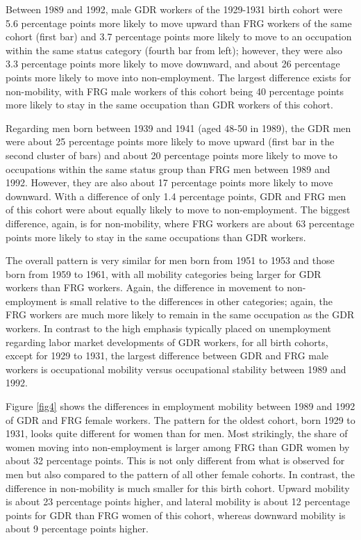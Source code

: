 \begin{Article}
\begin{refsection}[Spitz]
\pagebreak

Between 1989 and 1992, male GDR workers of the 1929-1931 birth cohort were 5.6 percentage points more likely to move upward than FRG workers of the same cohort (first bar) and 3.7 percentage points more likely to move to an occupation within the same status category (fourth bar from left); however, they were also 3.3 percentage points more likely to move downward, and about 26 percentage points more likely to move into non-employment. The largest difference exists for non-mobility, with FRG male workers of this cohort being 40 percentage points more likely to stay in the same occupation than GDR workers of this cohort.

Regarding men born between 1939 and 1941 (aged 48-50 in 1989), the GDR men were about 25 percentage points more likely to move upward (first bar in the second cluster of bars) and about 20 percentage points more likely to move to occupations within the same status group than FRG men between 1989 and 1992. However, they are also about 17 percentage points more likely to move downward. With a difference of only 1.4 percentage points, GDR and FRG men of this cohort were about equally likely to move to non-employment. The biggest difference, again, is for non-mobility, where FRG workers are about 63 percentage points more likely to stay in the same occupations than GDR workers.

The overall pattern is very similar for men born from 1951 to 1953 and those born from 1959 to 1961, with all mobility categories being larger for GDR workers than FRG workers. Again, the difference in movement to non-employment is small relative to the differences in other categories; again, the FRG workers are much more likely to remain in the same occupation as the GDR workers. In contrast to the high emphasis typically placed on unemployment regarding labor market developments of GDR workers, for all birth cohorts, except for 1929 to 1931, the largest difference between GDR and FRG male workers is occupational mobility versus occupational stability between 1989 and 1992.

Figure \ref{fig4} shows the differences in employment mobility between 1989 and 1992 of GDR and FRG female workers. The pattern for the oldest cohort, born 1929 to 1931, looks quite different for women than for men. Most strikingly, the share of women moving into non-employment is larger among FRG than GDR women by about 32 percentage points. This is not only different from what is observed for men but also compared to the pattern of all other female cohorts. In contrast, the difference in non-mobility is much smaller for this birth cohort. Upward mobility is about 23 percentage points higher, and lateral mobility is about 12 percentage points for GDR than FRG women of this cohort, whereas downward mobility is about 9 percentage points higher.


\end{refsection}
\end{Article}
